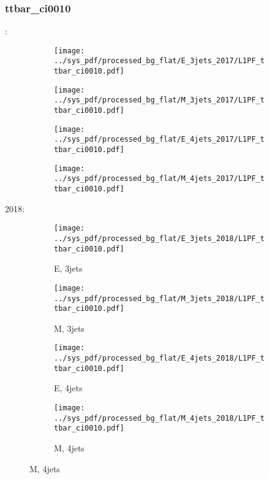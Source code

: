 \documentclass{beamer}
\begin{document}
\begin{frame}
\frametitle{ttbar_ci0010}
\fontsize{5}{1}:
\begin{figure}
\centering
\begin{subfigure}[b]{0.24\textwidth}
\texttt{[image: ../sys\_pdf/processed\_bg\_flat/E\_3jets\_2017/L1PF\_ttbar\_ci0010.pdf]}
\end{subfigure}
\begin{subfigure}[b]{0.24\textwidth}
\texttt{[image: ../sys\_pdf/processed\_bg\_flat/M\_3jets\_2017/L1PF\_ttbar\_ci0010.pdf]}
\end{subfigure}
\begin{subfigure}[b]{0.24\textwidth}
\texttt{[image: ../sys\_pdf/processed\_bg\_flat/E\_4jets\_2017/L1PF\_ttbar\_ci0010.pdf]}
\end{subfigure}
\begin{subfigure}[b]{0.24\textwidth}
\texttt{[image: ../sys\_pdf/processed\_bg\_flat/M\_4jets\_2017/L1PF\_ttbar\_ci0010.pdf]}
\end{subfigure}
\end{figure}
2018:
\begin{figure}
\centering
\begin{subfigure}[b]{0.24\textwidth}
\texttt{[image: ../sys\_pdf/processed\_bg\_flat/E\_3jets\_2018/L1PF\_ttbar\_ci0010.pdf]}
\captionsetup{font=tiny}
\caption{E, 3jets}
\end{subfigure}
\begin{subfigure}[b]{0.24\textwidth}
\texttt{[image: ../sys\_pdf/processed\_bg\_flat/M\_3jets\_2018/L1PF\_ttbar\_ci0010.pdf]}
\captionsetup{font=tiny}
\caption{M, 3jets}
\end{subfigure}
\begin{subfigure}[b]{0.24\textwidth}
\texttt{[image: ../sys\_pdf/processed\_bg\_flat/E\_4jets\_2018/L1PF\_ttbar\_ci0010.pdf]}
\captionsetup{font=tiny}
\caption{E, 4jets}
\end{subfigure}
\begin{subfigure}[b]{0.24\textwidth}
\texttt{[image: ../sys\_pdf/processed\_bg\_flat/M\_4jets\_2018/L1PF\_ttbar\_ci0010.pdf]}
\captionsetup{font=tiny}
\caption{M, 4jets}
\end{subfigure}
\end{figure}
\end{frame}
\end{document}
